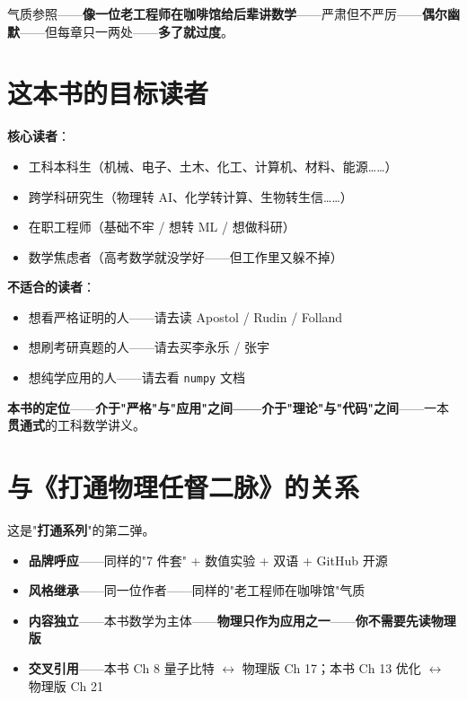 气质参照——\textbf{像一位老工程师在咖啡馆给后辈讲数学}——严肃但不严厉——\textbf{偶尔幽默}——但每章只一两处——\textbf{多了就过度}。

\section*{这本书的目标读者}

\textbf{核心读者}：

\begin{itemize}
\item 工科本科生（机械、电子、土木、化工、计算机、材料、能源……）
\item 跨学科研究生（物理转 AI、化学转计算、生物转生信……）
\item 在职工程师（基础不牢 / 想转 ML / 想做科研）
\item 数学焦虑者（高考数学就没学好——但工作里又躲不掉）
\end{itemize}

\textbf{不适合的读者}：

\begin{itemize}
\item 想看严格证明的人——请去读 Apostol / Rudin / Folland
\item 想刷考研真题的人——请去买李永乐 / 张宇
\item 想纯学应用的人——请去看 \texttt{numpy} 文档
\end{itemize}

\textbf{本书的定位}——\textbf{介于"严格"与"应用"之间——介于"理论"与"代码"之间}——一本\textbf{贯通式}的工科数学讲义。

\section*{与《打通物理任督二脉》的关系}

这是"\textbf{打通系列}"的第二弹。

\begin{itemize}
\item \textbf{品牌呼应}——同样的"7 件套" + 数值实验 + 双语 + GitHub 开源
\item \textbf{风格继承}——同一位作者——同样的"老工程师在咖啡馆"气质
\item \textbf{内容独立}——本书数学为主体——\textbf{物理只作为应用之一}——\textbf{你不需要先读物理版}
\item \textbf{交叉引用}——本书 Ch 8 量子比特 $\leftrightarrow$ 物理版 Ch 17；本书 Ch 13 优化 $\leftrightarrow$ 物理版 Ch 21
\end{itemize}

